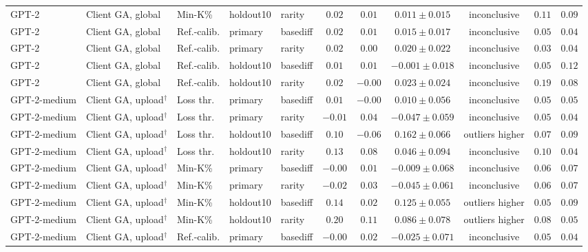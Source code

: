 {\begin{longtable}{@{\extracolsep{\fill}}lllllcccccc@{}}
GPT-2 & Client GA, global & Min-K\% & holdout10 & rarity & $0.02$ & $0.01$ & $0.011 \pm 0.015$ & inconclusive & $0.11$ & $0.09$ \\
GPT-2 & Client GA, global & Ref.-calib. & primary & basediff & $0.02$ & $0.01$ & $0.015 \pm 0.017$ & inconclusive & $0.05$ & $0.04$ \\
GPT-2 & Client GA, global & Ref.-calib. & primary & rarity & $0.02$ & $0.00$ & $0.020 \pm 0.022$ & inconclusive & $0.03$ & $0.04$ \\
GPT-2 & Client GA, global & Ref.-calib. & holdout10 & basediff & $0.01$ & $0.01$ & $-0.001 \pm 0.018$ & inconclusive & $0.05$ & $0.12$ \\
GPT-2 & Client GA, global & Ref.-calib. & holdout10 & rarity & $0.02$ & $-0.00$ & $0.023 \pm 0.024$ & inconclusive & $0.19$ & $0.08$ \\
GPT-2-medium & Client GA, upload$^{\dagger}$ & Loss thr. & primary & basediff & $0.01$ & $-0.00$ & $0.010 \pm 0.056$ & inconclusive & $0.05$ & $0.05$ \\
GPT-2-medium & Client GA, upload$^{\dagger}$ & Loss thr. & primary & rarity & $-0.01$ & $0.04$ & $-0.047 \pm 0.059$ & inconclusive & $0.05$ & $0.04$ \\
GPT-2-medium & Client GA, upload$^{\dagger}$ & Loss thr. & holdout10 & basediff & $0.10$ & $-0.06$ & $0.162 \pm 0.066$ & outliers higher & $0.07$ & $0.09$ \\
GPT-2-medium & Client GA, upload$^{\dagger}$ & Loss thr. & holdout10 & rarity & $0.13$ & $0.08$ & $0.046 \pm 0.094$ & inconclusive & $0.10$ & $0.04$ \\
GPT-2-medium & Client GA, upload$^{\dagger}$ & Min-K\% & primary & basediff & $-0.00$ & $0.01$ & $-0.009 \pm 0.068$ & inconclusive & $0.06$ & $0.07$ \\
GPT-2-medium & Client GA, upload$^{\dagger}$ & Min-K\% & primary & rarity & $-0.02$ & $0.03$ & $-0.045 \pm 0.061$ & inconclusive & $0.06$ & $0.07$ \\
GPT-2-medium & Client GA, upload$^{\dagger}$ & Min-K\% & holdout10 & basediff & $0.14$ & $0.02$ & $0.125 \pm 0.055$ & outliers higher & $0.05$ & $0.09$ \\
GPT-2-medium & Client GA, upload$^{\dagger}$ & Min-K\% & holdout10 & rarity & $0.20$ & $0.11$ & $0.086 \pm 0.078$ & outliers higher & $0.08$ & $0.05$ \\
GPT-2-medium & Client GA, upload$^{\dagger}$ & Ref.-calib. & primary & basediff & $-0.00$ & $0.02$ & $-0.025 \pm 0.071$ & inconclusive & $0.05$ & $0.04$ \\

\end{longtable}}
